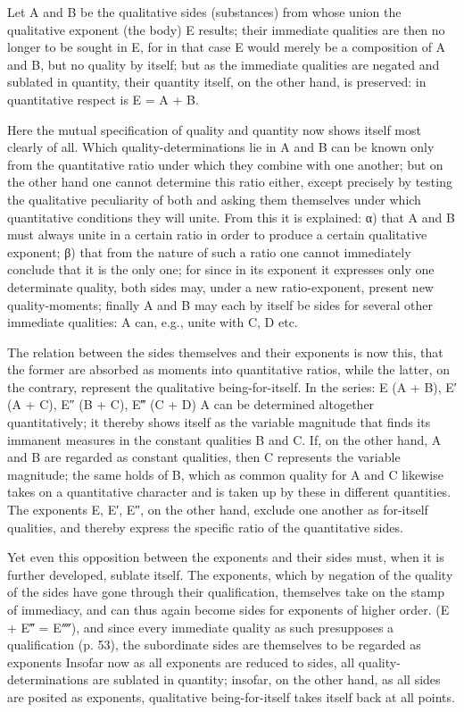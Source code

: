 \documentclass[12pt,a4paper,openany]{book}
\newcommand{\opage}[1]{\marginnote{\footnotesize\textit{[#1]}}}
\begin{document}
Let A and B be the qualitative sides (substances) from whose union the qualitative exponent (the body) E results; their immediate qualities are then no longer to be sought in E, for in that case E would merely be a composition of A and B, but no quality by itself; but as the immediate qualities are negated and sublated in quantity, their
\setcounter{footnote}{0}%
\opage{68}quantity itself, on the other hand, is preserved: in quantitative respect is
E = A + B.

Here the mutual specification of quality and quantity now shows itself most clearly of all. Which quality-determinations lie in A and B can be known only from the quantitative ratio under which they combine with one another; but on the other hand one cannot determine this ratio either, except precisely by testing the qualitative peculiarity of both and asking them themselves under which quantitative conditions they will unite. From this it is explained: α) that A and B must always unite in a certain ratio in order to produce a certain qualitative exponent; β) that from the nature of such a ratio one cannot immediately conclude that it is the only one; for since in its exponent it expresses only one determinate quality, both sides may, under a new ratio-exponent, present new quality-moments; finally A and B may each by itself be sides for several other immediate qualities: A can, e.g., unite with C, D etc.

The relation between the sides themselves and their exponents is now this, that the former are absorbed as moments into quantitative ratios, while the latter, on the contrary, represent the qualitative being-for-itself. In the series: E (A + B), E′ (A + C), E″ (B + C), E‴ (C + D) A can be determined altogether quantitatively; it thereby shows itself as the variable magnitude that finds its immanent measures in the constant qualities B and C. If, on the other hand, A and B are regarded as constant qualities, then C represents the variable magnitude; the same holds of B, which as common quality for A and C likewise takes on a quantitative character and is taken up by these in different quantities. The exponents E, E′, E″, on the other hand,
\setcounter{footnote}{0}%
\opage{69}exclude one another as for-itself qualities, and thereby express the specific ratio of the quantitative sides.

Yet even this opposition between the exponents and their sides must, when it is further developed, sublate itself. The exponents, which by negation of the quality of the sides have gone through their qualification, themselves take on the stamp of immediacy, and can thus again become sides for exponents of higher order. (E + E‴ = E⁗), and since every immediate quality as such presupposes a qualification (p. 53), the subordinate sides are themselves to be regarded as exponents Insofar now as all exponents are reduced to sides, all quality-determinations are sublated in quantity; insofar, on the other hand, as all sides are posited as exponents, qualitative being-for-itself takes itself back at all points.
\end{document}
